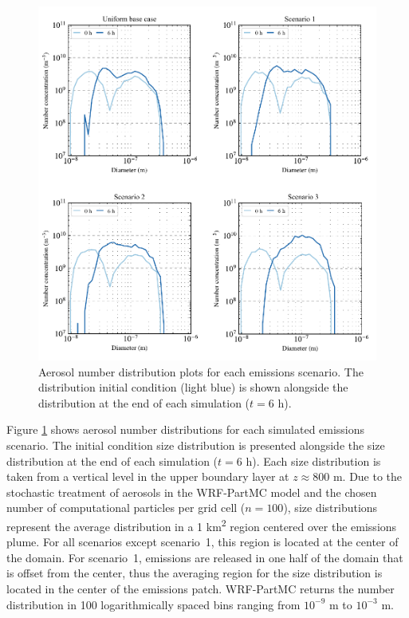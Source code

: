 \begin{figure}[!t]
  \centering
    \includegraphics[width=\textwidth]{figures/chapter5/number-distribution-plots.pdf}
    \caption{Aerosol number distribution plots for each emissions scenario. The distribution initial condition (light blue) is shown alongside the distribution at the end of each simulation ($t=6$ h).}
    \label{fig:number-dists}
\end{figure}

Figure \ref{fig:number-dists} shows aerosol number distributions for each simulated emissions scenario. The initial condition size distribution is presented alongside the size distribution at the end of each simulation ($t=6$ h). Each size distribution is taken from a vertical level in the upper boundary layer at $z\approx800$ \si{m}. Due to the stochastic treatment of aerosols in the WRF-PartMC model and the chosen number of computational particles per grid cell ($n=100$), size distributions represent the average distribution in a 1 \si{km^2} region centered over the emissions plume. For all scenarios except scenario~1, this region is located at the center of the domain. For scenario~1, emissions are released in one half of the domain that is offset from the center, thus the averaging region for the size distribution is located in the center of the emissions patch. WRF-PartMC returns the number distribution in 100 logarithmically spaced bins ranging from $10^{-9}$ m to $10^{-3}$ m.

